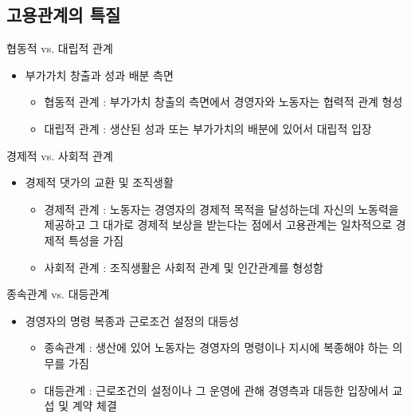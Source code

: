 \documentclass[aspectratio=169,xcolor=dvipsnames,handout]{beamer}
\begin{document}
\subsection{고용관계의 특질}

\begin{frame}{협동적 vs. 대립적 관계}
    \begin{itemize}
        \item 부가가치 창출과 성과 배분 측면
        \begin{itemize}
            \item 협동적 관계 : 부가가치 창출의 측면에서 경영자와 노동자는 협력적 관계 형성
            \item 대립적 관계 : 생산된 성과 또는 부가가치의 배분에 있어서 대립적 입장 
        \end{itemize}
    \end{itemize}
\end{frame}

\begin{frame}{경제적 vs. 사회적 관계}
    \begin{itemize}
        \item 경제적 댓가의 교환 및 조직생활
        \begin{itemize}
            \item 경제적 관계 : 노동자는 경영자의 경제적 목적을 달성하는데 자신의 노동력을 제공하고 그 대가로 경제적 보상을 받는다는 점에서 고용관계는 일차적으로 경제적 특성을 가짐 
            \item 사회적 관계 : 조직생활은 사회적 관계 및 인간관계를 형성함
        \end{itemize}
    \end{itemize}
\end{frame}

\begin{frame}{종속관계 vs. 대등관계}
    \begin{itemize}
        \item 경영자의 명령 복종과 근로조건 설정의 대등성
        \begin{itemize}
            \item 종속관계 : 생산에 있어 노동자는 경영자의 명령이나 지시에 복종해야 하는 의무를 가짐
            \item 대등관계 : 근로조건의 설정이나 그 운영에 관해 경영측과 대등한 입장에서 교섭 및 계약 체결
        \end{itemize}
    \end{itemize}
\end{frame}
\end{document}
